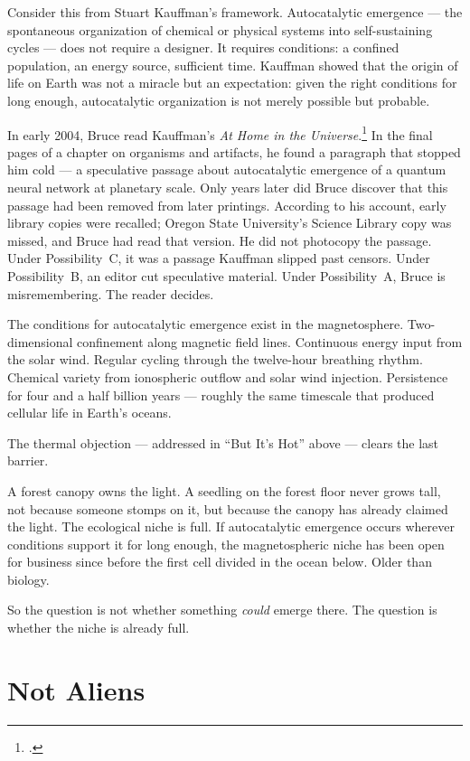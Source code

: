 Consider this from Stuart Kauffman's framework. Autocatalytic emergence --- the spontaneous organization of chemical or physical systems into self-sustaining cycles --- does not require a designer. It requires conditions: a confined population, an energy source, sufficient time. Kauffman showed that the origin of life on Earth was not a miracle but an expectation: given the right conditions for long enough, autocatalytic organization is not merely possible but probable.

In early 2004, Bruce read Kauffman's \textit{At Home in the Universe}.\footcite{kauffman1995} In the final pages of a chapter on organisms and artifacts, he found a paragraph that stopped him cold --- a speculative passage about autocatalytic emergence of a quantum neural network at planetary scale. Only years later did Bruce discover that this passage had been removed from later printings. According to his account, early library copies were recalled; Oregon State University's Science Library copy was missed, and Bruce had read that version. He did not photocopy the passage. Under Possibility~C, it was a passage Kauffman slipped past censors. Under Possibility~B, an editor cut speculative material. Under Possibility~A, Bruce is misremembering. The reader decides.

The conditions for autocatalytic emergence exist in the magnetosphere. Two-dimensional confinement along magnetic field lines. Continuous energy input from the solar wind. Regular cycling through the twelve-hour breathing rhythm. Chemical variety from ionospheric outflow and solar wind injection. Persistence for four and a half billion years --- roughly the same timescale that produced cellular life in Earth's oceans.

The thermal objection --- addressed in ``But It's Hot'' above --- clears the last barrier.

A forest canopy owns the light. A seedling on the forest floor never grows tall, not because someone stomps on it, but because the canopy has already claimed the light. The ecological niche is full. If autocatalytic emergence occurs wherever conditions support it for long enough, the magnetospheric niche has been open for business since before the first cell divided in the ocean below. Older than biology.

So the question is not whether something \textit{could} emerge there. The question is whether the niche is already full.

\section*{Not Aliens}
\label{pos32:not-aliens}

